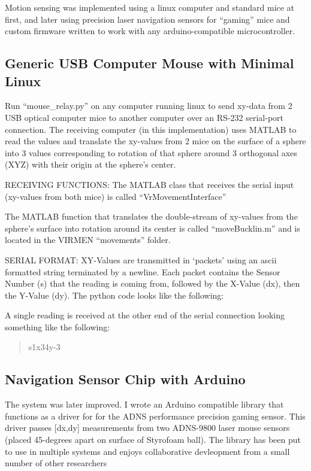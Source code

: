 Motion sensing was implemented using a linux computer and standard mice at first, and later using precision laser navigation sensors for ``gaming'' mice and custom firmware written to work with any arduino-compatible microcontroller.

\subsection{Generic USB Computer Mouse with Minimal Linux}\label{sec:generic-usb-computer-mouse-with-minimal-linux}

Run ``mouse\_relay.py'' on any computer running linux to send xy-data from 2 USB optical computer mice to another computer over an RS-232 serial-port connection.
The receiving computer (in this implementation) uses MATLAB to read the values and translate the xy-values from 2 mice on the surface of a sphere into 3 values corresponding to rotation of that sphere around 3 orthogonal axes (XYZ) with their origin at the sphere's center.

RECEIVING FUNCTIONS: The MATLAB class that receives the serial input (xy-values from both mice) is called ``VrMovementInterface''

The MATLAB function that translates the double-stream of xy-values from the sphere's surface into rotation around its center is called ``moveBucklin.m'' and is located in the VIRMEN ``movements'' folder.

SERIAL FORMAT: XY-Values are transmitted in `packets' using an ascii formatted string terminated by a newline.
Each packet contains the Sensor Number (s) that the reading is coming from, followed by the X-Value (dx), then the Y-Value (dy).
The python code looks like the following:

A single reading is received at the other end of the serial connection looking something like the following:

\begin{quote}
	s1x34y-3
\end{quote}

\subsection{Navigation Sensor Chip with Arduino}\label{sec:navigation-sensor-chip-with-arduino}

The system was later improved.
I wrote an Arduino compatible library that functions as a driver for for the ADNS performance precision gaming sensor.
This driver passes {[}dx,dy{]} measurements from two ADNS-9800 laser mouse sensors (placed 45-degrees apart on surface of Styrofoam ball).
The library has been put to use in multiple systems and enjoys collaborative devleopment from a small number of other researchers \cite{romano2019teensy}

